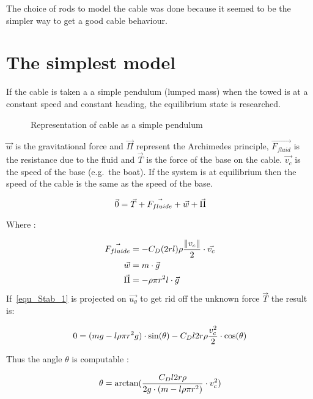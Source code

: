 The choice of rods to model the cable was done because it seemed to be the simpler
way to get a good cable behaviour.


\section{The simplest model}

If the cable is taken a a simple pendulum (lumped mass) when the towed is at a constant speed 
and constant heading, the equilibrium state is researched.


\begin{figure}[H]
\centering
{} %
{

}
\caption{Representation of cable as a simple pendulum}
\label{fig:model_pendulum}
\end{figure}


$\vec{w}$ is the gravitational force and $\vec{\Pi}$ represent the Archimedes principle, $\vec{F_{fluid}}$ is the resistance due to the fluid and $\vec{T}$ is the force of the base on the cable. $\vec{v_c}$ is the speed of the base (e.g.\ the boat). If the system is at equilibrium then the speed of the cable is the same as the speed of the base. 

\begin{equation}
 \vec{0} = \vec{T}+\vec{F_{fluide}}+\vec{w}+\vec{\Pi}\\
 \label{equ_Stab_1}
\end{equation}


Where :


{
\begin{align}
\centering
\vec{F_{fluide}} &= -C_D (2 r l) \rho \frac{ \|v_c\|}{2} \cdot \vec{v_c} \\
\vec{w} &= m \cdot \vec{g} \\
\vec{\Pi} &= - \rho \pi r^2 l \cdot \vec{g}
\end{align}
}
If~\ref{equ_Stab_1} is projected on $\vec{u_{\theta}}$ to get rid off the unknown force $\vec{T}$ the result is:

\begin{equation}
 0 = (m g - l \rho \pi r^2 g) \cdot \sin(\theta)-C_D l 2 r \rho \frac{v_c^2}{2} \cdot \cos(\theta)\\
 \label{equ_Stab_2}
\end{equation}

Thus the angle $\theta$ is computable :

\begin{equation}
 \theta = \arctan(\frac{C_D l 2 r \rho}{2 g \cdot (m - l \rho \pi r^2)} \cdot v_c^2)\\
 \label{equ_theta_1}
 \end{equation}
 
